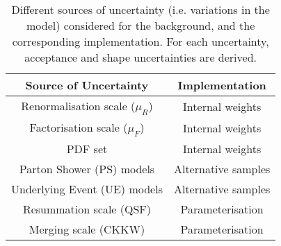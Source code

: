 %
\begin{table}[ht]
    \footnotesize\centering
    \setlength{\tabcolsep}{0.5em} %
    \begin{tabular}{cc}
        \toprule\hline
        \textbf{Source of Uncertainty}      & \textbf{Implementation} 
        \\
        \hline
        Renormalisation scale ($\mu_R$)     & Internal weights 
        \\
        Factorisation scale ($\mu_F$)       & Internal weights 
        \\
        PDF set                             & Internal weights
        \\
        Parton Shower (PS) models           & Alternative samples 
        \\
        Underlying Event (UE) models        & Alternative samples 
        \\
        Resummation scale (QSF)             & Parameterisation
        \\
        Merging scale (CKKW)                & Parameterisation
        \\
        \hline\bottomrule
    \end{tabular}
    \caption{Different sources of uncertainty (i.e. variations in the model) considered for the \Vjets background, and the corresponding implementation. For each uncertainty, acceptance and shape uncertainties are derived.}
    \label{tab:sources_of_uncertainty}
\end{table}
%